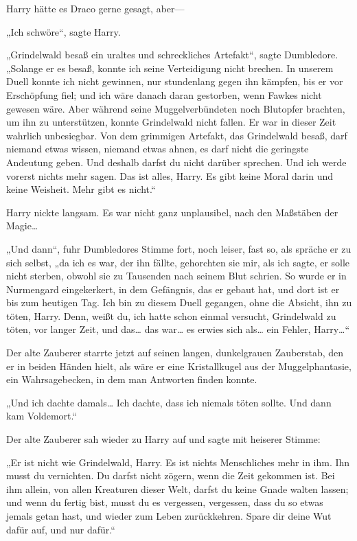 {Harry hätte es Draco gerne gesagt, aber—

„Ich schwöre“, sagte Harry.

„Grindelwald besaß ein uraltes und schreckliches Artefakt“, sagte Dumbledore. „Solange er es besaß, konnte ich seine Verteidigung nicht brechen. In unserem Duell konnte ich nicht gewinnen, nur stundenlang gegen ihn kämpfen, bis er vor Erschöpfung fiel; und ich wäre danach daran gestorben, wenn Fawkes nicht gewesen wäre. Aber während seine Muggelverbündeten noch Blutopfer brachten, um ihn zu unterstützen, konnte Grindelwald nicht fallen. Er war in dieser Zeit wahrlich unbesiegbar. Von dem grimmigen Artefakt, das Grindelwald besaß, darf niemand etwas wissen, niemand etwas ahnen, es darf nicht die geringste Andeutung geben. Und deshalb darfst du nicht darüber sprechen. Und ich werde vorerst nichts mehr sagen. Das ist alles, Harry. Es gibt keine Moral darin und keine Weisheit. Mehr gibt es nicht.“

Harry nickte langsam. Es war nicht ganz unplausibel, nach den Maßstäben der Magie…

„Und dann“, fuhr Dumbledores Stimme fort, noch leiser, fast so, als spräche er zu sich selbst, „da ich es war, der ihn fällte, gehorchten sie mir, als ich sagte, er solle nicht sterben, obwohl sie zu Tausenden nach seinem Blut schrien. So wurde er in Nurmengard eingekerkert, in dem Gefängnis, das er gebaut hat, und dort ist er bis zum heutigen Tag. Ich bin zu diesem Duell gegangen, ohne die Absicht, ihn zu töten, Harry. Denn, weißt du, ich hatte schon einmal versucht, Grindelwald zu töten, vor langer Zeit, und das… das war… es erwies sich als… ein Fehler, Harry…“

Der alte Zauberer starrte jetzt auf seinen langen, dunkelgrauen Zauberstab, den er in beiden Händen hielt, als wäre er eine Kristallkugel aus der Muggelphantasie, ein Wahrsagebecken, in dem man Antworten finden konnte.

„Und ich dachte damals… Ich dachte, dass ich niemals töten sollte. Und dann kam Voldemort.“

Der alte Zauberer sah wieder zu Harry auf und sagte mit heiserer Stimme:

„Er ist nicht wie Grindelwald, Harry. Es ist nichts Menschliches mehr in ihm. Ihn musst du vernichten. Du darfst nicht zögern, wenn die Zeit gekommen ist. Bei ihm allein, von allen Kreaturen dieser Welt, darfst du keine Gnade walten lassen; und wenn du fertig bist, musst du es vergessen, vergessen, dass du so etwas jemals getan hast, und wieder zum Leben zurückkehren. Spare dir deine Wut dafür auf, und nur dafür.“

}
